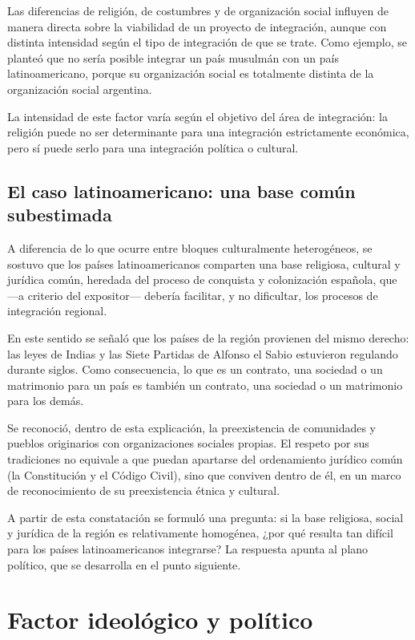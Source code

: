 \documentclass[12pt,oneside]{book}
\begin{document}
Las diferencias de religión, de costumbres y de organización social influyen de manera directa sobre la viabilidad de un proyecto de integración, aunque con distinta intensidad según el tipo de integración de que se trate. Como ejemplo, se planteó que no sería posible integrar un país musulmán con un país latinoamericano, porque su organización social es totalmente distinta de la organización social argentina.

La intensidad de este factor varía según el objetivo del área de integración: la religión puede no ser determinante para una integración estrictamente económica, pero sí puede serlo para una integración política o cultural.

\subsection{El caso latinoamericano: una base común subestimada}

A diferencia de lo que ocurre entre bloques culturalmente heterogéneos, se sostuvo que los países latinoamericanos comparten una base religiosa, cultural y jurídica común, heredada del proceso de conquista y colonización española, que —a criterio del expositor— debería facilitar, y no dificultar, los procesos de integración regional.

En este sentido se señaló que los países de la región provienen del mismo derecho: las leyes de Indias y las Siete Partidas de Alfonso el Sabio estuvieron regulando durante siglos. Como consecuencia, lo que es un contrato, una sociedad o un matrimonio para un país es también un contrato, una sociedad o un matrimonio para los demás.

Se reconoció, dentro de esta explicación, la preexistencia de comunidades y pueblos originarios con organizaciones sociales propias. El respeto por sus tradiciones no equivale a que puedan apartarse del ordenamiento jurídico común (la Constitución y el Código Civil), sino que conviven dentro de él, en un marco de reconocimiento de su preexistencia étnica y cultural.

A partir de esta constatación se formuló una pregunta: si la base religiosa, social y jurídica de la región es relativamente homogénea, ¿por qué resulta tan difícil para los países latinoamericanos integrarse? La respuesta apunta al plano político, que se desarrolla en el punto siguiente.

\section{Factor ideológico y político}
\end{document}
